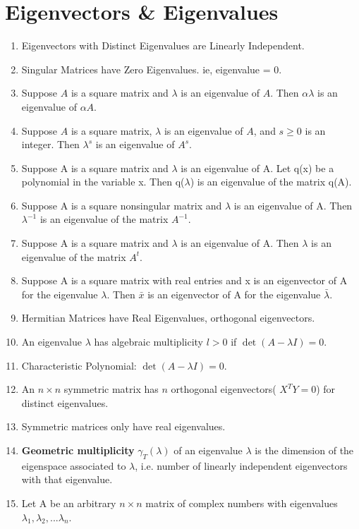 \documentclass[a4paper,oneside]{book}
\begin{document}
\section{Eigenvectors \& Eigenvalues}
\begin{enumerate}
\item Eigenvectors with Distinct Eigenvalues are Linearly Independent.
\item Singular Matrices have Zero Eigenvalues. ie, eigenvalue = 0.
\item Suppose $A$ is a square matrix and $\lambda$ is an eigenvalue of $A$. Then $\alpha \lambda$ is an eigenvalue of $\alpha A$.
\item Suppose $A$ is a square matrix, $\lambda$ is an eigenvalue of $A$, and $s \ge 0$ is an integer. Then $\lambda^s$ is an eigenvalue of $A^s$.
\item Suppose A is a square matrix and $\lambda$ is an eigenvalue of A. Let q(x) be a polynomial in the variable x. Then q($\lambda$) is an eigenvalue of the matrix q(A).
\item Suppose A is a square nonsingular matrix and $\lambda$ is an eigenvalue of A. Then $\lambda^{-1}$ is an eigenvalue of the matrix $A^{-1}$.
\item Suppose A is a square matrix and $\lambda$ is an eigenvalue of A. Then $\lambda$ is an eigenvalue of the matrix $A^t$.
\item Suppose A is a square matrix with real entries and x is an eigenvector of A for the eigenvalue $\lambda$. Then $\bar{x}$ is an eigenvector of A for the eigenvalue $\bar{\lambda}$.
\item Hermitian Matrices have Real Eigenvalues, orthogonal eigenvectors.
\item An eigenvalue $\lambda$ has algebraic multiplicity $l > 0$ if $\det(A - \lambda I) = 0$.
\item Characteristic Polynomial: $\det(A - \lambda I) = 0$.
\item An $n \times n$ symmetric matrix has $n$ orthogonal eigenvectors( $X^TY = 0$) for distinct eigenvalues.
\item Symmetric matrices only have real eigenvalues.
\item \textbf{Geometric multiplicity} $\gamma_T(\lambda)$ of an eigenvalue $\lambda$ is the dimension of the eigenspace associated to $\lambda$, i.e. number of linearly independent eigenvectors with that eigenvalue.
\item Let A be an arbitrary $n \times n$ matrix of complex numbers with eigenvalues $\lambda_1, \lambda_2, ... \lambda_n$. 

\end{enumerate}
\end{document}
